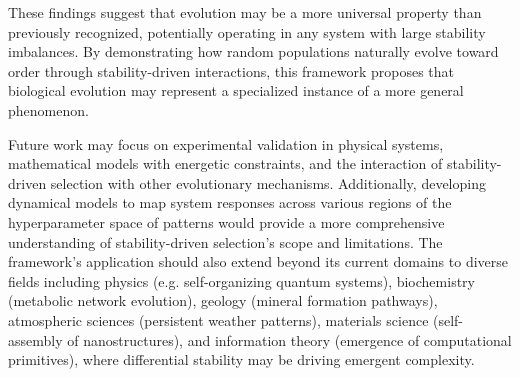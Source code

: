 \documentclass[preprint,12pt]{elsarticle}
\begin{document}
These findings suggest that evolution may be a more universal property than previously recognized, potentially operating in any system with large stability imbalances. By demonstrating how random populations naturally evolve toward order through stability-driven interactions, this framework proposes that biological evolution may represent a specialized instance of a more general phenomenon.

Future work may focus on experimental validation in physical systems, mathematical models with energetic constraints, and the interaction of stability-driven selection with other evolutionary mechanisms. Additionally, developing dynamical models to map system responses across various regions of the hyperparameter space of patterns would provide a more comprehensive understanding of stability-driven selection's scope and limitations. The framework's application should also extend beyond its current domains to diverse fields including physics (e.g. self-organizing quantum systems), biochemistry (metabolic network evolution), geology (mineral formation pathways), atmospheric sciences (persistent weather patterns), materials science (self-assembly of nanostructures), and information theory (emergence of computational primitives), where differential stability may be driving emergent complexity.


\vspace{6pt} 


\end{document}
